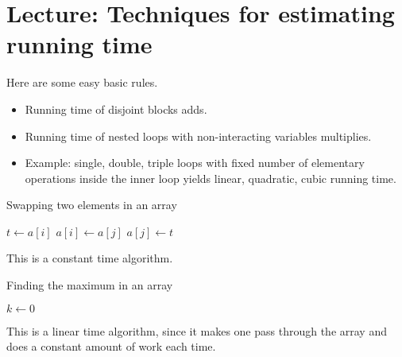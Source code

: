 \chapter{Lecture: Techniques for estimating running time}

Here are some easy basic rules.
\begin{itemize}
\item Running time of disjoint blocks adds.
\item Running time of nested  loops with non-interacting variables multiplies.
\item Example: single, double, triple loops with fixed number of elementary operations inside the inner loop yields linear, quadratic, cubic running time.
\end{itemize}


\begin{Example}
\begin{algorithm}[H]
  \caption{Swapping two elements in an array
    \label{alg:swap}}
\begin{algorithmic}[0]
\State $t \gets a[i]$
\State $a[i] \gets a[j]$
\State $a[j] \gets t$
\State {}
\EndFunction
\end{algorithmic}
\end{algorithm}

This is a constant time algorithm.
\end{Example}


\begin{Example}
\begin{algorithm}[H]
  \caption{Finding the maximum in an array
    \label{alg:findmax}}
\begin{algorithmic}[0]
\State $k \gets 0$ 
\EndIf
\EndFor
\State {}
\EndFunction
\end{algorithmic}
\end{algorithm}

This is a linear time algorithm, since it makes one pass through the array and does a constant amount of work each time.
\end{Example}



